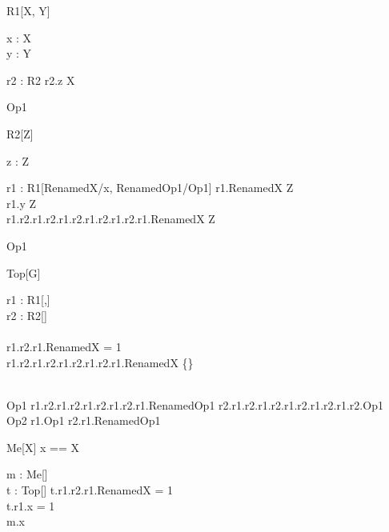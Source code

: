 \begin{class}{R1[X, Y]}
  \begin{axdef}
    x : X\\
    y : Y
  \end{axdef}
  \begin{state}
    r2 : R2
  \where
    r2.z \in X\\
  \end{state}
  Op1 \sdef [x? : \nat]
\end{class}

\begin{class}{R2[Z]}
  \begin{axdef}
    z : Z
  \end{axdef}
  \begin{state}
   r1 : R1[RenamedX/x, RenamedOp1/Op1]
  \where
    r1.RenamedX \in Z\\
    r1.y \in \finset Z\\
    r1.r2.r1.r2.r1.r2.r1.r2.r1.r2.r1.RenamedX \in Z
  \end{state}
  Op1 \sdef [x? : \nat]
\end{class} 

\begin{class}{Top[G]}
  \begin{state}
    r1 : R1[\nat,\nat]\\
    r2 : R2[\finset\finset\nat]\\
  \where\\
   r1.r2.r1.RenamedX = 1\\
   r1.r2.r1.r2.r1.r2.r1.r2.r1.RenamedX \in \{\}\\
  \end{state}\\
  Op1 \sdef  r1.r2.r1.r2.r1.r2.r1.r2.r1.RenamedOp1 \land
            r2.r1.r2.r1.r2.r1.r2.r1.r2.r1.r2.Op1\\
  Op2 \sdef r1.Op1 \land r2.r1.RenamedOp1
\end{class}

\begin{class}{Me[X]}
  x == X
  \begin{state} 
   m :  Me[\nat]\\
   t : Top[\nat]
  \where
    t.r1.r2.r1.RenamedX = 1\\
    t.r1.x = 1\\
    m.x \in \finset \nat
  \end{state}
\end{class}

